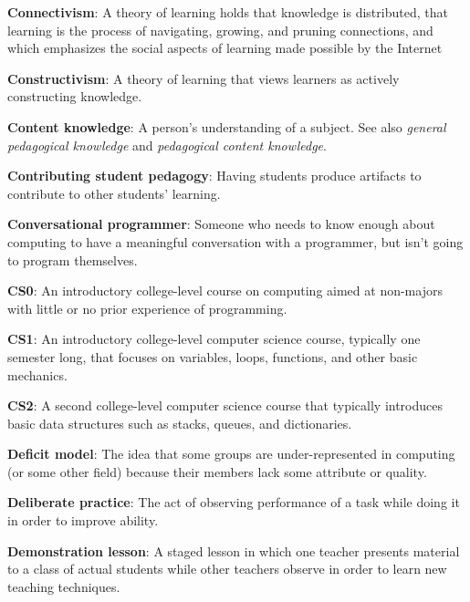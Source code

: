 \textbf{\hypertarget{g:connectivism}{Connectivism}\label{g:connectivism}}: A theory of learning holds
that knowledge is distributed, that learning is the process of
navigating, growing, and pruning connections, and which emphasizes the
social aspects of learning made possible by the Internet

\textbf{\hypertarget{g:constructivism}{Constructivism}\label{g:constructivism}}: A theory of learning that
views learners as actively constructing knowledge.

\textbf{\hypertarget{g:content-knowledge}{Content knowledge}\label{g:content-knowledge}}: A person's
understanding of a subject. See also \emph{general pedagogical knowledge} and
\emph{pedagogical content knowledge}.

\textbf{\hypertarget{g:contributing-student}{Contributing student pedagogy}\label{g:contributing-student}}:
Having students produce artifacts to contribute to other students'
learning.

\textbf{\hypertarget{g:conversational-programmer}{Conversational programmer}\label{g:conversational-programmer}}:
Someone who needs to know enough about computing to have a meaningful
conversation with a programmer, but isn't going to program themselves.

\textbf{\hypertarget{g:cs0}{CS0}\label{g:cs0}}: An introductory college-level course on
computing aimed at non-majors with little or no prior experience of
programming.

\textbf{\hypertarget{g:cs1}{CS1}\label{g:cs1}}: An introductory college-level computer science
course, typically one semester long, that focuses on variables, loops,
functions, and other basic mechanics.

\textbf{\hypertarget{g:cs2}{CS2}\label{g:cs2}}: A second college-level computer science course
that typically introduces basic data structures such as stacks, queues,
and dictionaries.

\textbf{\hypertarget{g:deficit-model}{Deficit model}\label{g:deficit-model}}: The idea that some groups
are under-represented in computing (or some other field) because their
members lack some attribute or quality.

\textbf{\hypertarget{g:deliberate-practice}{Deliberate practice}\label{g:deliberate-practice}}: The act of
observing performance of a task while doing it in order to improve
ability.

\textbf{\hypertarget{g:demonstration-lesson}{Demonstration lesson}\label{g:demonstration-lesson}}: A staged
lesson in which one teacher presents material to a class of actual
students while other teachers observe in order to learn new teaching
techniques.


